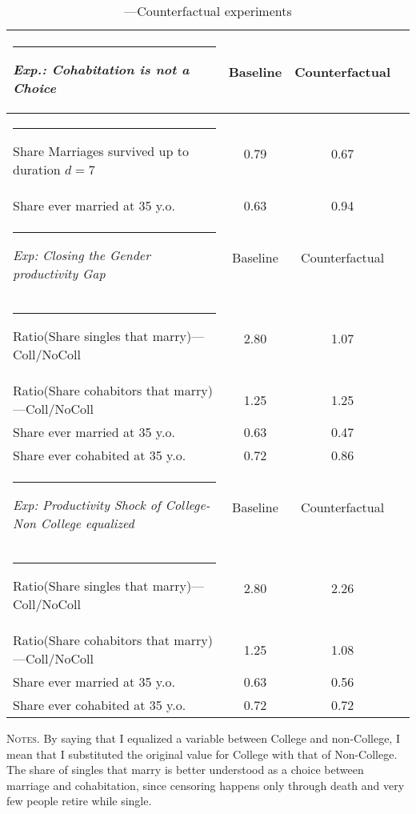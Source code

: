 \documentclass[12pt]{article}
\begin{document}
 \begin{table}[h!]
	\centering
	\begin{threeparttable}\centering
		\caption{---Counterfactual experiments} %
		\label{table:exp} %
		\centering %
		\begin{tabular}{@{} l c c c  @{}}  %
			\hline\hline %
			\rule{-4pt}{2.5ex}
			\textit{Exp.: Cohabitation is not a Choice} & Baseline  & Counterfactual  \\ [0.05ex] %
			\hline %
			\rule{-4pt}{2.5ex}
			Share Marriages survived up to duration $d=7$   & 0.79 & 0.67 & \\[0.15ex]
			Share ever married at 35 y.o.                        & 0.63 & 0.94 & \\[0.15ex]
			\hline \hline%
			\rule{-4pt}{2.5ex}
			\textit{Exp: Closing the Gender productivity Gap}& Baseline  & Counterfactual  \\ [0.05ex] %
			\hline 
			\rule{-4pt}{2.5ex}
			Ratio(Share singles that marry)---Coll/NoColl  & 2.80 & 1.07 \\[0.15ex]
			Ratio(Share cohabitors that marry)---Coll/NoColl   & 1.25 & 1.25 \\[0.15ex]
			Share ever married at 35 y.o.   & 0.63 & 0.47 \\[0.15ex]
			Share ever cohabited at 35 y.o.   & 0.72 & 0.86\\[0.15ex]
			\hline \hline
			\rule{-4pt}{2.5ex}
			\textit{Exp: Productivity Shock of College-Non College equalized}& Baseline  & Counterfactual  \\ [0.05ex] %
			\hline 
			\rule{-4pt}{2.5ex}
			Ratio(Share singles that marry)---Coll/NoColl  & 2.80 & 2.26 \\[0.15ex]
			Ratio(Share cohabitors that marry)---Coll/NoColl   & 1.25& 1.08 \\[0.15ex]
			Share ever married at 35 y.o.   & 0.63 & 0.56 \\[0.15ex]
			Share ever cohabited at 35 y.o.   & 0.72 & 0.72 \\[0.15ex]
			\hline \hline
		\end{tabular}
		\begin{tablenotes}[flushleft]
			\footnotesize{\item \textsc{Notes.} By saying that I equalized a variable between College and non-College, I mean that I substituted the original value for College with that of Non-College. The share of singles that marry is better understood as a choice between marriage and cohabitation, since censoring happens only through death and very few people retire while single.}
		\end{tablenotes}
	\end{threeparttable}
\end{table}
\vspace{-1cm}
\end{document}

